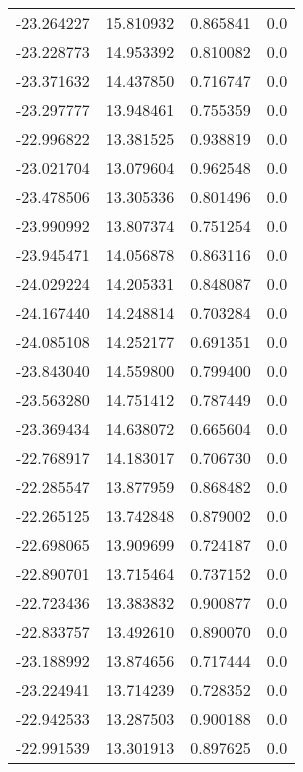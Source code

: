\begin{tabular}{rrrr}
      -23.264227 &        15.810932 &    0.865841 &   0.0 \\
      -23.228773 &        14.953392 &    0.810082 &   0.0 \\
      -23.371632 &        14.437850 &    0.716747 &   0.0 \\
      -23.297777 &        13.948461 &    0.755359 &   0.0 \\
      -22.996822 &        13.381525 &    0.938819 &   0.0 \\
      -23.021704 &        13.079604 &    0.962548 &   0.0 \\
      -23.478506 &        13.305336 &    0.801496 &   0.0 \\
      -23.990992 &        13.807374 &    0.751254 &   0.0 \\
      -23.945471 &        14.056878 &    0.863116 &   0.0 \\
      -24.029224 &        14.205331 &    0.848087 &   0.0 \\
      -24.167440 &        14.248814 &    0.703284 &   0.0 \\
      -24.085108 &        14.252177 &    0.691351 &   0.0 \\
      -23.843040 &        14.559800 &    0.799400 &   0.0 \\
      -23.563280 &        14.751412 &    0.787449 &   0.0 \\
      -23.369434 &        14.638072 &    0.665604 &   0.0 \\
      -22.768917 &        14.183017 &    0.706730 &   0.0 \\
      -22.285547 &        13.877959 &    0.868482 &   0.0 \\
      -22.265125 &        13.742848 &    0.879002 &   0.0 \\
      -22.698065 &        13.909699 &    0.724187 &   0.0 \\
      -22.890701 &        13.715464 &    0.737152 &   0.0 \\
      -22.723436 &        13.383832 &    0.900877 &   0.0 \\
      -22.833757 &        13.492610 &    0.890070 &   0.0 \\
      -23.188992 &        13.874656 &    0.717444 &   0.0 \\
      -23.224941 &        13.714239 &    0.728352 &   0.0 \\
      -22.942533 &        13.287503 &    0.900188 &   0.0 \\
      -22.991539 &        13.301913 &    0.897625 &   0.0 \\

\end{tabular}
